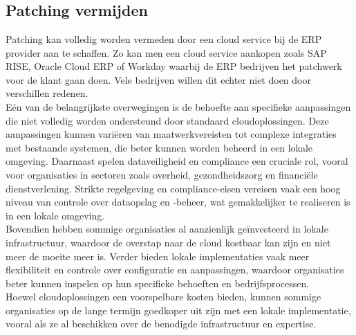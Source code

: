 \documentclass[dutch,dit,thesis]{hogentreport}
\begin{document}
\chapter{}
\label{ch:corpus}

\section{Patching vermijden}

Patching kan volledig worden vermeden door een cloud service bij de ERP provider aan te schaffen. Zo kan men een cloud service aankopen zoals SAP RISE, Oracle Cloud ERP of Workday waarbij de ERP bedrijven het patchwerk voor de klant gaan doen. Vele bedrijven
 willen dit echter niet doen door verschillen redenen.\\
 
 Eén van de belangrijkste overwegingen is de behoefte aan specifieke aanpassingen die niet volledig worden ondersteund door standaard cloudoplossingen. 
 Deze aanpassingen kunnen variëren van maatwerkvereisten tot complexe integraties met bestaande systemen, die beter kunnen worden beheerd in een lokale omgeving.
Daarnaast spelen dataveiligheid en compliance een cruciale rol, vooral voor organisaties in sectoren zoals overheid, gezondheidszorg en financiële dienstverlening.
 Strikte regelgeving en compliance-eisen vereisen vaak een hoog niveau van controle over dataopslag en -beheer, wat gemakkelijker te realiseren is in een lokale omgeving.\\ 

Bovendien hebben sommige organisaties al aanzienlijk geïnvesteerd in lokale infrastructuur, waardoor de overstap naar de cloud kostbaar kan zijn en niet meer de moeite meer is.
Verder bieden lokale implementaties vaak meer flexibiliteit en controle over configuratie en aanpassingen, waardoor organisaties beter kunnen inspelen op hun specifieke behoeften en 
bedrijfsprocessen.\\

Hoewel cloudoplossingen een voorspelbare kosten bieden, kunnen sommige organisaties op de lange termijn goedkoper uit zijn met een lokale implementatie, vooral als
ze al beschikken over de benodigde infrastructuur en expertise.\\
\end{document}
